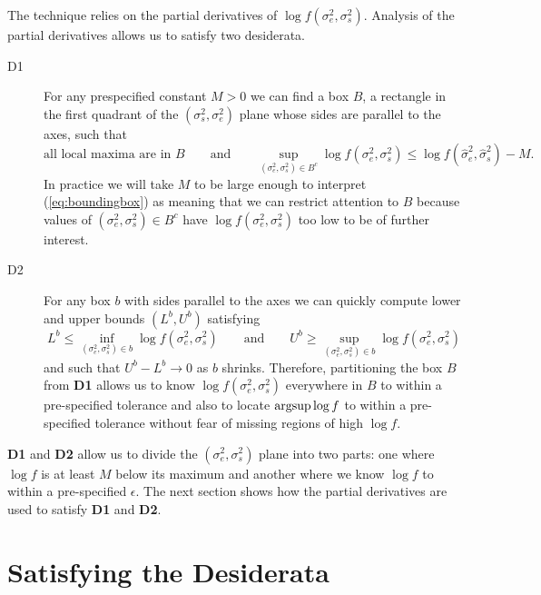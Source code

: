 \documentclass{report}
\newcommand{\RL}{f}
\newcommand{\logRL}{\log\RL}
\newcommand{\sigssq}{\sigma_s^2}
\newcommand{\sigesq}{\sigma_e^2}
\newcommand{\sshat}{\hat\sigma^2_e,\hat\sigma^2_s}
\newcommand{\logRLss}{\logRL(\sigesq,\sigssq)}
\newcommand{\argsup}{\operatornamewithlimits{argsup}}
\begin{document}
The technique relies on the partial derivatives of $\logRLss$.  Analysis of the partial derivatives allows us to satisfy two desiderata.
\begin{description}
\item[D1] For any prespecified constant $M>0$ we can find a box $B$, a rectangle in the first quadrant of the $(\sigssq, \sigesq)$ plane whose sides are parallel to the axes, such that
\begin{equation}
\label{eq:boundingbox}
	\text{all local maxima are in $B$} \qquad \text{and} \qquad \sup_{(\sigesq, \sigssq) \in B^c} \logRLss \le \logRL(\sshat) - M.
\end{equation}
In practice we will take $M$ to be large enough to interpret (\ref{eq:boundingbox}) as meaning that we can restrict attention to $B$ because values of $(\sigesq, \sigssq) \in B^c$ have $\logRLss$ too low to be of further interest.

\item[D2] For any box $b$ with sides parallel to the axes we can quickly compute lower and upper bounds $(L^b,U^b)$ satisfying
\begin{equation*}
  L^b \le \inf_{(\sigesq, \sigssq) \in b}\logRLss \qquad\text{and}\qquad
  U^b \ge \sup_{(\sigesq, \sigssq) \in b}\logRLss
\end{equation*}
and such that $U^b-L^b \rightarrow 0$ as $b$ shrinks.  Therefore, partitioning the box $B$ from \textbf{D1} allows us to know $\logRLss$ everywhere in $B$ to within a pre-specified tolerance and also to locate $\argsup\logRL$ to within a pre-specified tolerance without fear of missing regions of high $\logRL$.
\end{description}
\textbf{D1} and \textbf{D2} allow us to divide the $(\sigesq,\sigssq)$ plane into two parts: one where $\logRL$ is at least $M$ below its maximum and another where we know $\logRL$ to within a pre-specified $\epsilon$.  The next section shows how the partial derivatives are used to satisfy \textbf{D1} and \textbf{D2}.

\section{Satisfying the Desiderata}
\end{document}
